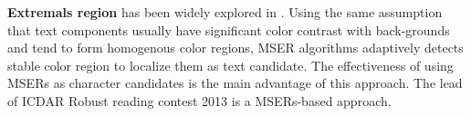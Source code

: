 \textbf{Extremals region} has been widely explored in \cite{Neumann12} \cite{xucheng.2013.pami} \cite{Shi_2013:_MSER}. Using the same assumption that text components usually have significant color contrast with back-grounds and tend to form homogenous color regions, MSER algorithms adaptively detects stable color region to localize them as text candidate. The effectiveness of using MSERs as character candidates is the main advantage of this approach. The lead of ICDAR Robust reading contest 2013 is a MSERs-based approach.





